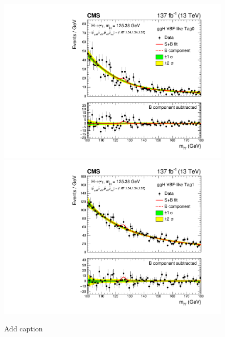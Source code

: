 \begin{figure}[htbp]
  \includegraphics[width=.32\linewidth]{Figures/app_sb_models/RECO_VBFLIKEGGH_Tag0_CMS_hgg_mass.pdf}
  \includegraphics[width=.32\linewidth]{Figures/app_sb_models/RECO_VBFLIKEGGH_Tag1_CMS_hgg_mass.pdf}
  \caption[Observed diphoton mass distributions]
  {
    Add caption
  }
  \label{fig:diphoton_mass_2}
\end{figure}

